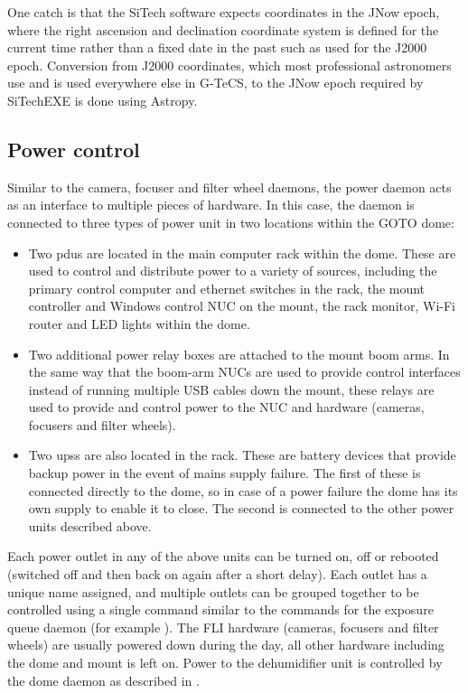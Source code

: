 \begin{colsection}
\begin{colsection}
One catch is that the SiTech software expects coordinates in the JNow epoch, where the right ascension and declination coordinate system is defined for the current time rather than a fixed date in the past such as used for the J2000 epoch. Conversion from J2000 coordinates, which most professional astronomers use and is used everywhere else in G-TeCS, to the JNow epoch required by SiTechEXE is done using Astropy.

\end{colsection}


\subsection{Power control}
\label{sec:power}
\begin{colsection}

Similar to the camera, focuser and filter wheel daemons, the power daemon acts as an interface to multiple pieces of hardware. In this case, the daemon is connected to three types of power unit in two locations within the GOTO dome:

\begin{itemize}
    \item Two \glspl{pdu} are located in the main computer rack within the dome. These are used to control and distribute power to a variety of sources, including the primary control computer and ethernet switches in the rack, the mount controller and Windows control NUC on the mount, the rack monitor, Wi-Fi router and LED lights within the dome.
    \item Two additional power relay boxes are attached to the mount boom arms. In the same way that the boom-arm NUCs are used to provide control interfaces instead of running multiple USB cables down the mount, these relays are used to provide and control power to the NUC and hardware (cameras, focusers and filter wheels).
    \item Two \glspl{ups} are also located in the rack. These are battery devices that provide backup power in the event of mains supply failure. The first of these is connected directly to the dome, so in case of a power failure the dome has its own supply to enable it to close. The second is connected to the other power units described above.
\end{itemize}

Each power outlet in any of the above units can be turned on, off or rebooted (switched off and then back on again after a short delay). Each outlet has a unique name assigned, and multiple outlets can be grouped together to be controlled using a single command similar to the commands for the exposure queue daemon (for example ). The FLI hardware (cameras, focusers and filter wheels) are usually powered down during the day, all other hardware including the dome and mount is left on. Power to the dehumidifier unit is controlled by the dome daemon as described in .


\end{colsection}
\end{colsection}
